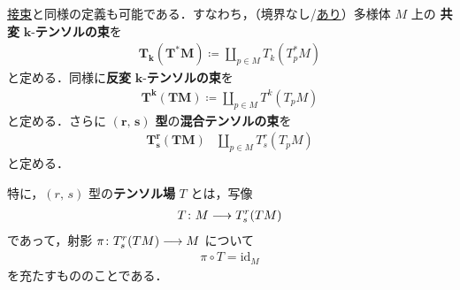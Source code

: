 \documentclass[geometry_main]{subfiles}
\begin{document}
\hyperref[def:bundle-tangent]{接束}と同様の定義も可能である．すなわち，（境界なし/\hyperref[def:mani-with-boundary]{あり}）\cinfty 多様体 $M$ 上の
\textbf{共変} $\bm{k}$-\textbf{テンソルの束}を
\begin{align}
	\bm{T_k (T^* M)} \coloneqq \coprod_{p \in M} T_k(T^*_p M)
\end{align}
と定める．同様に\textbf{反変} $\bm{k}$-\textbf{テンソルの束}を
\begin{align}
	\bm{T^k (TM)} \coloneqq \coprod_{p \in M} T^k(T_p M)
\end{align}
と定める．さらに $\bm{(r,\, s)}$ \textbf{型}の\textbf{混合テンソルの束}を
\begin{align}
	\bm{T^r_s(TM)} &\coprod_{p \in M} T^r_s (T_p M)
\end{align}
と定める．

特に，$(r,\, s)$ 型の\textbf{テンソル場} $T$ とは，\cinfty 写像
\begin{align}
	T \colon M \longrightarrow T^r_s(TM)
\end{align}
であって，射影 $\pi \colon T^r_s(TM) \longrightarrow M$ について
\begin{align}
	\pi \circ T = \mathrm{id}_M
\end{align}
を充たすもののことである．
\end{document}
